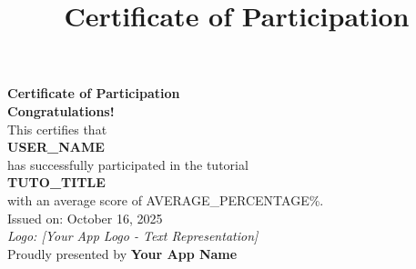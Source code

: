 \documentclass[a4paper,12pt]{article}
\title{Certificate of Participation}
\author{}
\date{}
\begin{document}

\maketitle
\vspace{-2cm} %

\begin{center}
    \Huge{\color{certtext}\textbf{Certificate of Participation}} \\
    \vspace{1cm}
    \LARGE{\color{certtext}\textbf{Congratulations!}} \\
    \vspace{0.5cm}
    \normalsize{\color{certtext}This certifies that} \\
    \vspace{0.2cm}
    \Large{\color{certtext}\textbf{{USER_NAME}}} \\ %
    \vspace{0.2cm}
    \normalsize{\color{certtext}has successfully participated in the tutorial} \\
    \vspace{0.2cm}
    \Large{\color{certtext}\textbf{{TUTO_TITLE}}} \\ %
    \vspace{0.5cm}
    \normalsize{\color{certtext}with an average score of {AVERAGE_PERCENTAGE}\%.} \\
    \vspace{0.5cm}
    \normalsize{\color{certtext}Issued on: October 16, 2025} \\ %
    \vspace{1cm}
    \normalsize{\color{certtext}\textit{Logo: [Your App Logo - Text Representation]}} \\
    \vspace{0.5cm}
    \normalsize{\color{certtext}Proudly presented by \textbf{Your App Name}} %
\end{center}
\end{document}
